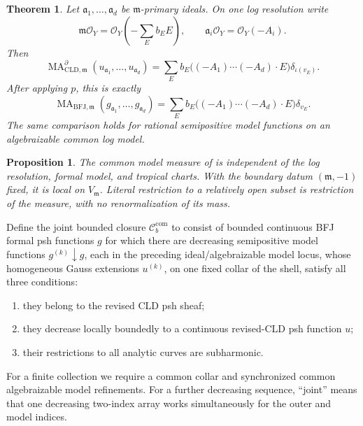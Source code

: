 \documentclass[11pt,a4paper]{article}
\newtheorem{theorem}{Theorem}[section]
\newtheorem{proposition}[proposition]{Proposition}
\theoremstyle{definition}
\theoremstyle{remark}
\DeclareMathOperator{\MA}{MA}
\begin{document}
\begin{theorem}\label{thm:frontier-local-ma-model-comparison}
Let \(\mathfrak a_1,\ldots,\mathfrak a_d\) be
\(\mathfrak m\)-primary ideals.  On one log resolution write
\[
 \mathfrak m\mathcal O_Y=\mathcal O_Y\!\left(-\sum_Eb_EE\right),
 \qquad
 \mathfrak a_i\mathcal O_Y=\mathcal O_Y(-A_i).
\]
Then
\begin{equation}
 \MA^{\partial}_{\mathrm{CLD},\mathfrak m}
       (u_{\mathfrak a_1},\ldots,u_{\mathfrak a_d})
 =\sum_E b_E\bigl((-A_1)\cdots(-A_d)\cdot E\bigr)
       \delta_{\iota(v_E)}.
 \label{eq:frontier-local-ma-cld-atomic}
\end{equation}
After applying \(p\), this is exactly
\begin{equation}
 \MA_{\mathrm{BFJ},\mathfrak m}
       (g_{\mathfrak a_1},\ldots,g_{\mathfrak a_d})
 =\sum_E b_E\bigl((-A_1)\cdots(-A_d)\cdot E\bigr)
       \delta_{v_E}.
 \label{eq:frontier-local-ma-bfj-atomic}
\end{equation}
The same comparison holds for rational semipositive model functions on an
algebraizable common log model.
\end{theorem}



\begin{proposition}\label{prop:frontier-local-ma-independence}
The common model measure of
 is independent of the log
resolution, formal model, and tropical charts.  With the boundary datum
\((\mathfrak m,-1)\) fixed, it is local on \(V_{\mathfrak m}\).  Literal
restriction to a relatively open subset is restriction of the measure, with
no renormalization of its mass.
\end{proposition}



Define the joint bounded closure \(\mathcal C_b^{\mathrm{com}}\) to consist
of bounded continuous BFJ formal psh functions \(g\) for which there are
decreasing semipositive model functions \(g^{(k)}\downarrow g\), each in
the preceding ideal/algebraizable model locus, whose homogeneous Gauss
extensions \(u^{(k)}\), on one fixed collar of the shell, satisfy all three
conditions:
\begin{enumerate}
\item they belong to the revised CLD psh sheaf;
\item they decrease locally boundedly to a continuous revised-CLD psh
      function \(u\);
\item their restrictions to all analytic curves are subharmonic.
\end{enumerate}
For a finite collection we require a common collar and synchronized common
algebraizable model refinements.  For a further decreasing sequence,
``joint'' means that one decreasing two-index array works simultaneously for
the outer and model indices.
\end{document}
